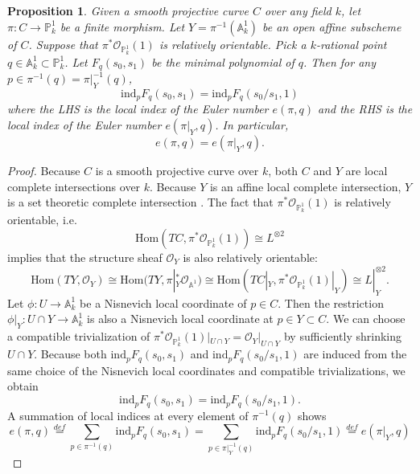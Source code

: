 \documentclass[12pt, reqno]{amsart}
\newtheorem{proposition}[theorem]{Proposition}
\theoremstyle{definition}
\newcommand{\A}{\mathbb{A}} %
\newcommand{\Proj}{\mathbb{P}} %
\newcommand{\Oh}{\mathscr{O}} %
\newcommand{\ind}{\mathrm{ind}} %
\begin{document}
\begin{proposition} \label{curve_euler_number_2}
Given a smooth projective curve $C$ over any field $k$, let $\pi: C \to \Proj^1_k$ be a finite morphism. Let $Y = \pi^{-1}(\A^1_k)$ be an open affine subscheme of $C$. Suppose that $\pi^* \Oh_{\Proj^1_k}(1)$ is relatively orientable. Pick a $k$-rational point $q \in \A^1_k \subset \Proj^1_k$. Let $F_q(s_0, s_1)$ be the minimal polynomial of $q$. Then for any $p \in \pi^{-1}(q) = \pi|_Y^{-1}(q)$,
\begin{equation*}
    \ind_p F_q(s_0,s_1) = \ind_p F_q(s_0/s_1, 1)
\end{equation*}
where the LHS is the local index of the Euler number $e(\pi, q)$ and the RHS is the local index of the Euler number $e(\pi|_Y, q)$. In particular,
\begin{equation*}
    e(\pi, q) = e(\pi|_Y, q).
\end{equation*}
\end{proposition}
\begin{proof}
Because $C$ is a smooth projective curve over $k$, both $C$ and $Y$ are local complete intersections over $k$. Because $Y$ is an affine local complete intersection, $Y$ is a set theoretic complete intersection \cite[Corollary 5]{ku78}. The fact that $\pi^* \Oh_{\Proj^1_k}(1)$ is relatively orientable, i.e.
\begin{equation*}
    \text{Hom}(TC, \pi^* \Oh_{\Proj^1_k}(1)) \cong L^{\otimes 2}
\end{equation*}
implies that the structure sheaf $\Oh_Y$ is also relatively orientable:
\begin{equation*}
    \text{Hom}(TY, \Oh_Y) \cong \text{Hom}(TY, \pi|_Y^* \Oh_{\A^1}) \cong \text{Hom}(TC|_{Y}, \pi^* \Oh_{\Proj^1_k}(1)|_{Y}) \cong L|_Y^{\otimes 2}.
\end{equation*}
Let $\phi: U \to \A^1_k$ be a Nisnevich local coordinate of $p \in C$. Then the restriction $\phi|_Y: U \cap Y \to \A^1_k$ is also a Nisnevich local coordinate at $p \in Y \subset C$. We can choose a compatible trivialization of $\pi^* \Oh_{\Proj^1_k}(1)|_{U \cap Y} = \Oh_Y|_{U \cap Y}$ by sufficiently shrinking $U \cap Y$. Because both $\ind_p F_q(s_0, s_1)$ and $\ind_p F_q(s_0/s_1,1)$ are induced from the same choice of the Nisnevich local coordinates and compatible trivializations, we obtain
\begin{equation*}
    \ind_p F_q(s_0,s_1) = \ind_p F_q(s_0/s_1, 1).
\end{equation*}
A summation of local indices at every element of $\pi^{-1}(q)$ shows
\begin{equation*}
    e(\pi, q) \overset{def}{=} \sum_{p \in \pi^{-1}(q)} \ind_p F_q(s_0,s_1) = \sum_{p \in \pi|_Y^{-1}(q)} \ind_p F_q(s_0/s_1,1) \overset{def}{=} e(\pi|_Y, q)
\end{equation*}
\end{proof}
\end{document}
